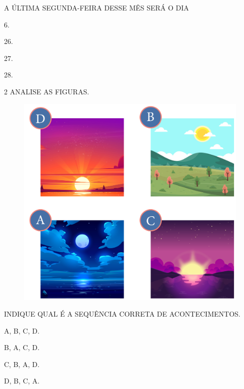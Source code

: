 A ÚLTIMA SEGUNDA-FEIRA DESSE MÊS SERÁ O DIA

\begin{escolha}
\item 6.

\item 26.

\item 27.

\item 28.
\end{escolha}

\num{2} ANALISE AS FIGURAS.




\begin{figure}[H]
\centering
\includegraphics[width=.6\textwidth]{./media/SAEB_1ANO_MAT_FIGURA62.png}
\end{figure}

INDIQUE QUAL É A SEQUÊNCIA CORRETA DE ACONTECIMENTOS.

\begin{escolha}
\item A, B, C, D.

\item B, A, C, D.

\item C, B, A, D.

\item D, B, C, A.
\end{escolha}

